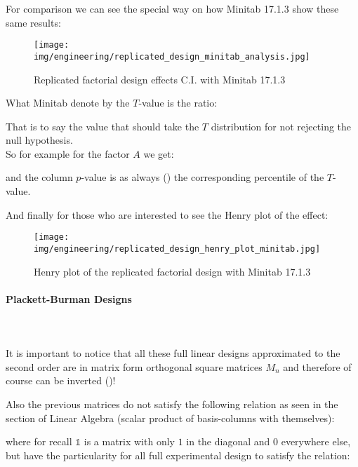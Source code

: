	For comparison we can see the special way on how Minitab 17.1.3 show these same results:
	\begin{figure}[H]
		\begin{center}
		\texttt{[image: img/engineering/replicated\_design\_minitab\_analysis.jpg]}
		\end{center}	
		\caption[]{Replicated factorial design effects C.I. with Minitab 17.1.3}
	\end{figure}
	\begin{tcolorbox}[title=Remark,colframe=black,arc=10pt]
	What Minitab denote by the $T$-value is the ratio:
	
	That is to say the value that should take the $T$ distribution for not rejecting the null hypothesis.\\
	
	So for example for the factor $A$ we get:
	
	and the column $p$-value is as always () the corresponding percentile of the $T$-value.
	\end{tcolorbox}
	And finally for those who are interested to see the Henry plot of the effect:
	\begin{figure}[H]
		\begin{center}
		\texttt{[image: img/engineering/replicated\_design\_henry\_plot\_minitab.jpg]}
		\end{center}	
		\caption{Henry plot of the replicated factorial design with Minitab 17.1.3}
	\end{figure}
	
	\pagebreak
	\paragraph{Plackett-Burman Designs}\mbox{}\\\\
	It is important to notice that all these full linear designs approximated to the second order are in matrix form orthogonal square matrices $M_{n}$ and therefore of course can be inverted ()!
	
	Also the previous matrices do not satisfy the following relation as seen in the section of Linear Algebra (scalar product of basis-columns with themselves):
	
	where for recall $\mathds{1}$ is a matrix with only $1$ in the diagonal and $0$ everywhere else, but have the particularity for all full experimental design to satisfy the relation:
	
